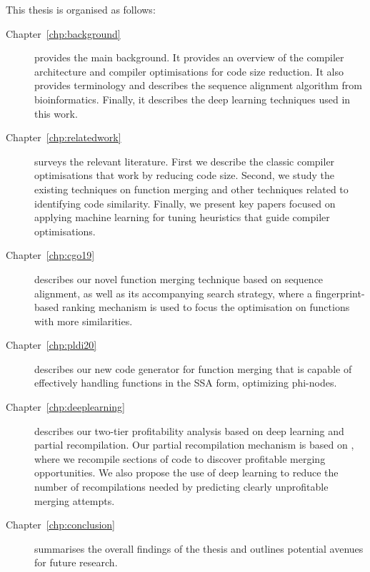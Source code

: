 This thesis is organised as follows:
\begin{description}

\item[Chapter~\ref{chp:background}] provides the main background. It provides an overview of the compiler architecture and compiler optimisations for code size reduction.
It also provides terminology and describes the sequence alignment algorithm from bioinformatics.
Finally, it describes the deep learning techniques used in this work.

\item[Chapter~\ref{chp:relatedwork}] surveys the relevant literature. First we describe the classic compiler optimisations that work by reducing code size. Second, we study the existing techniques on function merging and other techniques related to identifying code similarity. Finally, we present key papers focused on applying machine learning for tuning heuristics that guide compiler optimisations.

\item[Chapter~\ref{chp:cgo19}] describes our novel function merging technique based on sequence alignment, as well as its accompanying search strategy, where a fingerprint-based ranking mechanism is used to focus the optimisation on functions with more similarities. %

\item[Chapter~\ref{chp:pldi20}] describes our new code generator for function merging that is capable of effectively handling functions in the SSA form, optimizing phi-nodes.

\item[Chapter~\ref{chp:deeplearning}] describes our two-tier profitability analysis based on deep learning and partial recompilation. Our partial recompilation mechanism is based on {\itercomp}, where we recompile sections of code to discover profitable merging opportunities. We also propose the use of deep learning to reduce the number of recompilations needed by predicting clearly unprofitable merging attempts.

\item[Chapter~\ref{chp:conclusion}] summarises the overall findings of the thesis and outlines potential avenues for future research.

\end{description}
